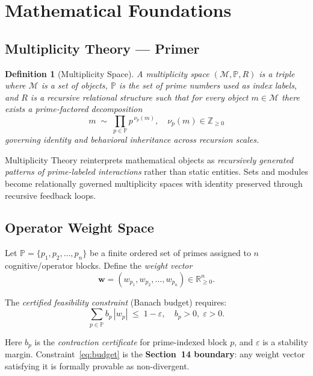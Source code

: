 \documentclass[12pt,letterpaper]{article}
\newtheorem{definition}[theorem]{Definition}
\begin{document}
\section{Mathematical Foundations}

\subsection{Multiplicity Theory --- Primer}

\begin{definition}[Multiplicity Space]
A \emph{multiplicity space} $(\mathcal{M}, \mathbb{P}, R)$ is a triple
where $\mathcal{M}$ is a set of objects, $\mathbb{P}$ is the set of
prime numbers used as index labels, and $R$ is a recursive relational
structure such that for every object $m \in \mathcal{M}$ there exists a
prime-factored decomposition
\[
  m \;\sim\; \prod_{p \in \mathbb{P}} p^{\,\nu_p(m)}, \quad \nu_p(m) \in \mathbb{Z}_{\geq 0}
\]
governing identity and behavioral inheritance across recursion scales.
\end{definition}

Multiplicity Theory reinterprets mathematical objects as
\emph{recursively generated patterns of prime-labeled interactions}
rather than static entities. Sets and modules become relationally
governed multiplicity spaces with identity preserved through recursive
feedback loops.

\subsection{Operator Weight Space}

Let $\mathbb{P} = \{p_1, p_2, \ldots, p_n\}$ be a finite ordered set of
primes assigned to $n$ cognitive/operator blocks. Define the
\emph{weight vector}
\[
  \mathbf{w} = (w_{p_1}, w_{p_2}, \ldots, w_{p_n}) \in \mathbb{R}^n_{\geq 0}.
\]

The \emph{certified feasibility constraint} (Banach budget) requires:
\begin{equation}
  \sum_{p \in \mathbb{P}} b_p \,|w_p| \;\leq\; 1 - \varepsilon,
  \quad b_p > 0,\; \varepsilon > 0. \label{eq:budget}
\end{equation}

Here $b_p$ is the \emph{contraction certificate} for prime-indexed block
$p$, and $\varepsilon$ is a stability margin. Constraint~\eqref{eq:budget}
is the \textbf{Section~14 boundary}: any weight vector satisfying it is
formally provable as non-divergent.
\end{document}
